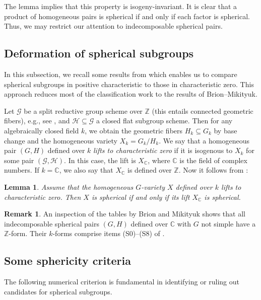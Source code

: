 \documentclass[12pt]{amsart}
\newcommand\CG{{\mathcal G}}
\newcommand\CH{{\mathcal H}}
\newcommand\BBC{{\mathbb C}}
\newcommand\BBZ{{\mathbb Z}}
\numberwithin{equation}{section}
\newtheorem{lemma}[lemma]{Lemma}
\theoremstyle{definition}
\newtheorem{remark}[remark]{Remark}
\begin{document}
The lemma implies that this property is
isogeny-invariant. It is clear that a product of homogeneous pairs is
spherical if and only if each factor is spherical. Thus, we may
restrict our attention to indecomposable spherical pairs.

\subsection{Deformation of spherical subgroups}
\label{subsec:deformation}
In this subsection, we recall some results from \cite[Thm.\ 3.4]{KR}
which enables us to compare spherical subgroups in positive
characteristic to those in characteristic zero. This approach reduces
most of the classification work to the results of Brion--Mikityuk.

Let $\CG$ be a split reductive group scheme over $\BBZ$ (this entails
connected geometric fibers), e.g., see \cite[Exp.~I,
4.2]{demazurgrothendieck:schemasengroupes}, and $\CH\subseteq\CG$ a
closed flat subgroup scheme. Then for any algebraically closed field
$k$, we obtain the geometric fibers $H_k\subseteq G_k$ by base change
and the homogeneous variety $X_k=G_k/H_k$. We say that a homogeneous pair
$(G,H)$ defined over $k$ \emph{lifts to characteristic zero} if it is
isogenous to $X_k$ for some pair $(\CG,\CH)$. In this case, the lift
is $X_\BBC$, where $\BBC$ is the field of complex numbers. If
$k=\BBC$, we also say that $X_\BBC$ is defined over $\BBZ$.  Now it
follows from \cite[Thm.\ 3.4]{KR}:

\begin{lemma}
  \label{Theorem1}
  Assume that the homogeneous $G$-variety $X$ defined over $k$
  lifts to characteristic zero. Then $X$ is spherical if and only if its
  lift $X_\BBC$ is spherical.
\end{lemma}

\begin{remark}
  An inspection of the tables by Brion and Mikityuk shows that all
  indecomposable spherical pairs $(G,H)$ defined over $\BBC$ with $G$
  not simple have a $\BBZ$-form. Their $k$-forms comprise items
  (S0)--(S8) of .
\end{remark}

\subsection{Some sphericity criteria}

The following numerical criterion is fundamental in identifying or
ruling out candidates for spherical subgroups.
\end{document}
